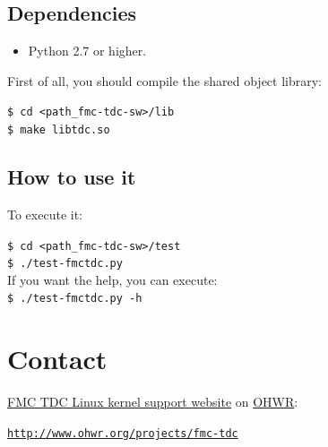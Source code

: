 \documentclass[a4paper,11pt]{article}
\begin{document}
\subsection{Dependencies}
\begin{itemize}
  \item Python 2.7 or higher.
\end{itemize}
First of all, you should compile the shared object library:

\indent\indent\texttt{\$ cd <path\_fmc-tdc-sw>/lib} \\
\indent\indent\texttt{\$ make libtdc.so}

\subsection{How to use it}

To execute it:

\indent\indent\texttt{\$ cd <path\_fmc-tdc-sw>/test} \\
\indent\indent\texttt{\$ ./test-fmctdc.py} \\
If you want the help, you can execute:\\
\indent\indent\texttt{\$ ./test-fmctdc.py -h} \\

\section{Contact}
\href{http://www.ohwr.org/projects/fmc-tdc}{FMC TDC Linux kernel support website} on \href{http://www.ohwr.org/}{OHWR}:

\indent\indent\texttt{\url{http://www.ohwr.org/projects/fmc-tdc}}
\end{document}

